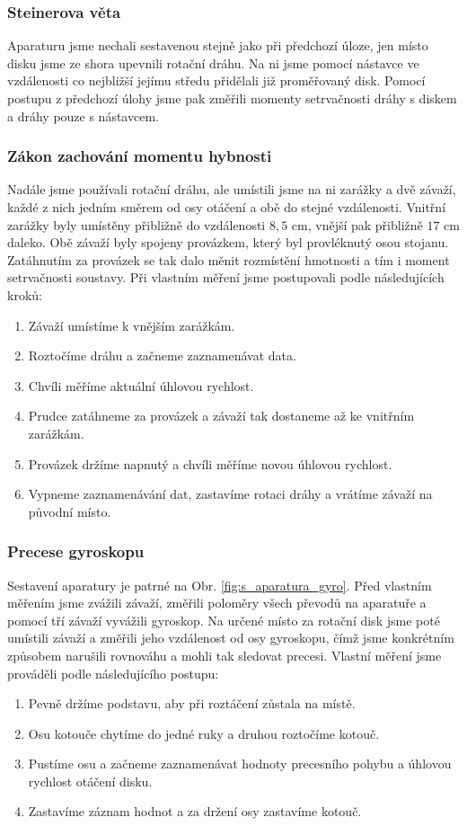 \documentclass[english]{article}
\begin{document}
	\subsubsection{Steinerova věta}
		Aparaturu jsme nechali sestavenou stejně jako při předchozí úloze, jen místo disku jsme ze shora upevnili rotační dráhu. Na ni jsme pomocí nástavce ve vzdálenosti co nejbližší jejímu středu přidělali již proměřovaný disk. Pomocí postupu z předchozí úlohy jsme pak změřili momenty setrvačnosti dráhy s diskem a dráhy pouze s nástavcem. 

	\subsubsection{Zákon zachování momentu hybnosti}
	Nadále jsme používali rotační dráhu, ale umístili jsme na ni zarážky a dvě závaží, každé z nich jedním směrem od osy otáčení a obě do stejné vzdálenosti. Vnitřní zarážky byly umístěny přibližně do vzdálenosti $8,5$ cm, vnější pak přibližně $17$ cm daleko. Obě závaží byly spojeny provázkem, který byl provléknutý osou stojanu. Zatáhnutím za provázek se tak dalo měnit rozmístění hmotnosti a tím i moment setrvačnosti soustavy. Při vlastním měření jsme postupovali podle následujících kroků:
	\begin{enumerate}
		\item Závaží umístíme k vnějším zarážkám.
		\item Roztočíme dráhu a začneme zaznamenávat data.
		\item Chvíli měříme aktuální úhlovou rychlost.
		\item Prudce zatáhneme za provázek a závaží tak dostaneme až ke vnitřním zarážkám.
		\item Provázek držíme napnutý a chvíli měříme novou úhlovou rychlost.
		\item Vypneme zaznamenávání dat, zastavíme rotaci dráhy a vrátíme závaží na původní místo.
	\end{enumerate}
	
	\subsubsection{Precese gyroskopu}
	Sestavení aparatury je patrné na Obr. \ref{fig:s_aparatura_gyro}. Před vlastním měřením jsme zvážili závaží, změřili poloměry všech převodů na aparatuře a pomocí tří závaží vyvážili gyroskop. Na určené místo za rotační disk jsme poté umístili závaží a změřili jeho vzdálenost od osy gyroskopu, čímž jsme konkrétním způsobem narušili rovnováhu a mohli tak sledovat precesi. Vlastní měření jsme prováděli podle následujícího postupu:
	\begin{enumerate}
		\item Pevně držíme podstavu, aby při roztáčení zůstala na místě.
		\item Osu kotouče chytíme do jedné ruky a druhou roztočíme kotouč.
		\item Pustíme osu a začneme zaznamenávat hodnoty precesního pohybu a úhlovou rychlost otáčení disku.
		\item Zastavíme záznam hodnot a za držení osy zastavíme kotouč.
	\end{enumerate}
	
\end{document}
